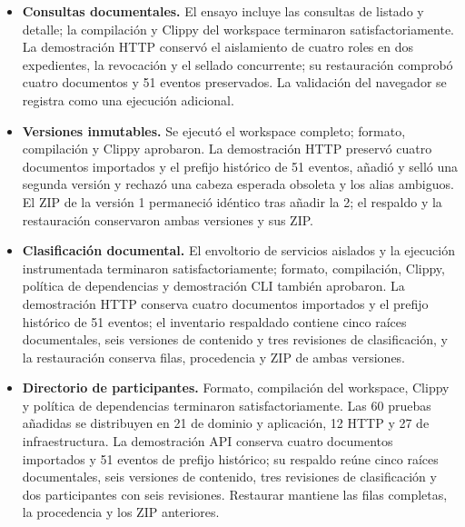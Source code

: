 \begin{itemize}
  \item \textbf{Consultas documentales.} El ensayo incluye las consultas de listado y detalle; la compilación y Clippy del workspace terminaron satisfactoriamente. La demostración HTTP conservó el aislamiento de cuatro roles en dos expedientes, la revocación y el sellado concurrente; su restauración comprobó cuatro documentos y 51 eventos preservados. La validación del navegador se registra como una ejecución adicional.
  \item \textbf{Versiones inmutables.} Se ejecutó el workspace completo; formato, compilación y Clippy aprobaron. La demostración HTTP preservó cuatro documentos importados y el prefijo histórico de 51 eventos, añadió y selló una segunda versión y rechazó una cabeza esperada obsoleta y los alias ambiguos. El ZIP de la versión 1 permaneció idéntico tras añadir la 2; el respaldo y la restauración conservaron ambas versiones y sus ZIP.
  \item \textbf{Clasificación documental.} El envoltorio de servicios aislados y la ejecución instrumentada terminaron satisfactoriamente; formato, compilación, Clippy, política de dependencias y demostración CLI también aprobaron. La demostración HTTP conserva cuatro documentos importados y el prefijo histórico de 51 eventos; el inventario respaldado contiene cinco raíces documentales, seis versiones de contenido y tres revisiones de clasificación, y la restauración conserva filas, procedencia y ZIP de ambas versiones.
  \item \textbf{Directorio de participantes.} Formato, compilación del workspace, Clippy y política de dependencias terminaron satisfactoriamente. Las 60 pruebas añadidas se distribuyen en 21 de dominio y aplicación, 12 HTTP y 27 de infraestructura. La demostración API conserva cuatro documentos importados y 51 eventos de prefijo histórico; su respaldo reúne cinco raíces documentales, seis versiones de contenido, tres revisiones de clasificación y dos participantes con seis revisiones. Restaurar mantiene las filas completas, la procedencia y los ZIP anteriores.
\end{itemize}

